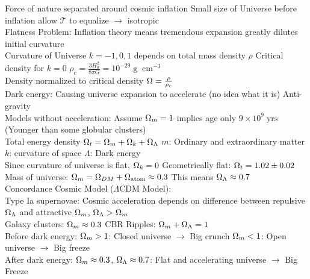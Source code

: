 \documentclass{article}
\DeclareMathOperator{\yrs}{yrs}
\DeclareMathOperator{\cm}{cm}
\DeclareMathOperator{\g}{g}
\begin{document}
Force of nature separated around cosmic inflation \quad Small size of Universe before inflation allow $\mathcal{T}$ to equalize $\rightarrow$ isotropic\\
Flatness Problem: Inflation theory means tremendous expansion greatly dilutes initial curvature\\
Curvature of Universe $k=-1,0,1$ depends on total mass density $\rho$ \quad Critical density for $k=0$ $\rho_{c}=\frac{3H_{0}^{2}}{8\pi G}=10^{-29}\g\cm^{-3}$\\
Density normalized to critical density $\ohm=\frac{\rho}{\rho_{c}}$\\
Dark energy: Causing universe expansion to accelerate (no idea what it is) \quad Anti-gravity\\
Models without acceleration: Assume $\ohm_{m}=1$ implies age only $9\times 10^{9}\yrs$ (Younger than some globular clusters)\\
Total energy density $\ohm_{t}=\ohm_{m}+\ohm_{k}+\ohm_{\Lambda}$ \quad $m$: Ordinary and extraordinary matter \quad $k$: curvature of space \quad $\Lambda$: Dark energy\\
Since curvature of universe is flat, $\ohm_{k}=0$ \quad Geometrically flat: $\ohm_{t}=1.02\pm 0.02$\\
Mass of universe: $\ohm_{m}=\ohm_{DM}+\ohm_{\text{atom}}\approx 0.3$ \quad This means $\ohm_{\Lambda}\approx 0.7$\\
Concordance Cosmic Model ($\Lambda$CDM Model):\\
Type Ia supernovae: Cosmic acceleration depends on difference between repulsive $\ohm_{\Lambda}$ and attractive $\ohm_{m}$, $\ohm_{\Lambda}>\ohm_{m}$\\
Galaxy clusters: $\ohm_{m}\approx 0.3$ \quad CBR Ripples: $\ohm_{m}+\ohm_{\Lambda}=1$\\
Before dark energy: $\ohm_{m}>1$: Closed universe $\rightarrow$ Big crunch \quad $\ohm_{m}<1$: Open universe $\rightarrow$ Big freeze\\
After dark energy: $\ohm_{m}\approx 0.3$, $\ohm_{\Lambda}\approx 0.7$: Flat and accelerating universe $\rightarrow$ Big Freeze
\end{document}
